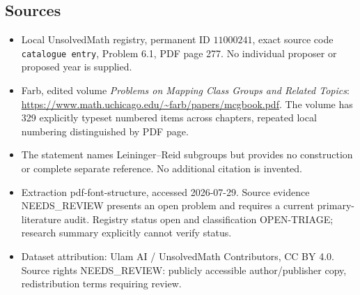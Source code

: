 \documentclass[11pt]{article}
\begin{document}
\subsection{Sources}
\begin{itemize}
\item Local UnsolvedMath registry, permanent ID \(11000241\), exact source code \texttt{catalogue entry}, Problem 6.1, PDF page 277. No individual proposer or proposed year is supplied.
\item Farb, edited volume \emph{Problems on Mapping Class Groups and Related Topics}: \url{https://www.math.uchicago.edu/~farb/papers/mcgbook.pdf}. The volume has 329 explicitly typeset numbered items across chapters, repeated local numbering distinguished by PDF page.
\item The statement names Leininger--Reid subgroups but provides no construction or complete separate reference. No additional citation is invented.
\item Extraction pdf-font-structure, accessed 2026-07-29. Source evidence NEEDS\_REVIEW presents an open problem and requires a current primary-literature audit. Registry status open and classification OPEN-TRIAGE; research summary explicitly cannot verify status.
\item Dataset attribution: Ulam AI / UnsolvedMath Contributors, CC BY 4.0. Source rights NEEDS\_REVIEW: publicly accessible author/publisher copy, redistribution terms requiring review.
\end{itemize}
\end{document}
